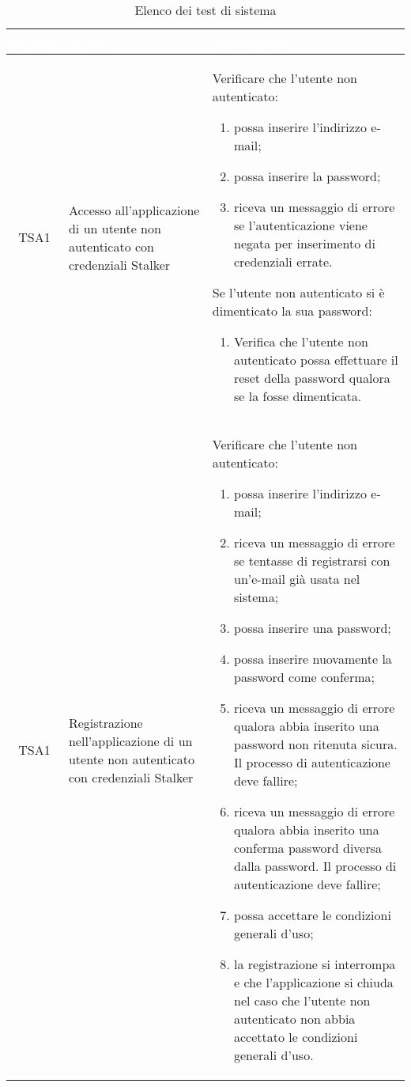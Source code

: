 {
\renewcommand{\arraystretch}{1.5}
\centering
\begin{longtable}{ c | C{3cm} | C{11cm} }
\caption{Elenco dei test di sistema}\\
\textcolor{white}{\textbf{Codice}} & \textcolor{white}{\textbf{Titolo}} & \textcolor{white}{\textbf{Descrizione}} \\
\hline
\endhead

TSA1 & Accesso all'applicazione di un utente non autenticato con credenziali Stalker &
Verificare che l'utente non autenticato:
\begin{enumerate}
    \item possa inserire l'indirizzo e-mail;
    \item possa inserire la password;
    \item riceva un messaggio di errore se l'autenticazione viene negata per inserimento di credenziali errate.
\end{enumerate}
Se l'utente non autenticato si è dimenticato la sua password:
\begin{enumerate}
    \item Verifica che l'utente non autenticato possa effettuare il reset della password qualora se la fosse dimenticata.
\end{enumerate} \\

TSA1 & Registrazione nell'applicazione di un utente non autenticato con credenziali Stalker &
Verificare che l'utente non autenticato:
\begin{enumerate}
    \item possa inserire l'indirizzo e-mail;
    \item riceva un messaggio di errore se tentasse di registrarsi con un'e-mail già usata nel sistema;
    \item possa inserire una password;
    \item possa inserire nuovamente la password come conferma;
    \item riceva un messaggio di errore qualora abbia inserito una password non ritenuta sicura. Il processo di autenticazione deve fallire;
    \item riceva un messaggio di errore qualora abbia inserito una conferma password diversa dalla password. Il processo di autenticazione deve fallire;
    \item possa accettare le condizioni generali d'uso;
    \item la registrazione si interrompa e che l'applicazione si chiuda nel caso che l'utente non autenticato non abbia accettato le condizioni generali d'uso.
\end{enumerate} \\


\end{longtable}}

